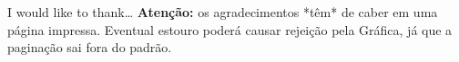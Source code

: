 \documentclass[%
        TwoSidePages,%
        English,%
        FinalVersion,%
        Copyright,%
        TablesPage,%
        FiguresPage,%
        ]%
{ic-tese-v2}
\begin{document}

 I would like to thank\ldots
\textbf{Aten\c{c}\~ao:} os agradecimentos *t\^em* de caber em uma p\'agina impressa. Eventual estouro
 poder\'a causar rejei\c{c}\~ao pela Gr\'afica, j\'a que a pagina\c{c}\~ao sai fora do padr\~ao.




    \afterpreface %

\end{document}
